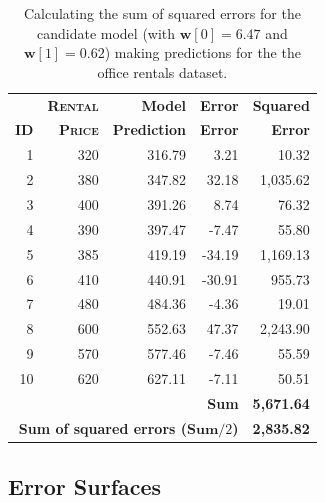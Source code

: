 \documentclass[xcolor={table}]{beamer}
\newcommand{\featN}[1]{\textsc{#1}}
\begin{document}
 \begin{frame} 
\begin{table}
	\caption{Calculating the sum of squared errors for the candidate model (with $\mathbf{w}[0] = 6.47$ and $\mathbf{w}[1] = 0.62$) making predictions for the the office rentals dataset.}
	\centering
			\begin{footnotesize}
	\begin{tabular}{r r r r r }
		\hline
				\textbf{} & \textbf{\featN{Rental}} & \textbf{Model} & \textbf{Error} & \textbf{Squared} \\
		\textbf{ID} & \textbf{\featN{Price}} & \textbf{Prediction} & \textbf{Error} & \textbf{Error} \\
		\hline
		1 & 320	&	316.79	&	3.21	&	10.32	\\
		2 & 380	&	347.82	&	32.18	&	1,035.62	\\
		3 & 400	&	391.26	&	8.74	&	76.32	\\
		4 & 390	&	397.47	&	-7.47	&	55.80	\\
		5 & 385	&	419.19	&	-34.19	&	1,169.13	\\
		6 & 410	&	440.91	&	-30.91	&	955.73	\\
		7 & 480	&	484.36	&	-4.36	&	19.01	\\
		8 & 600	&	552.63	&	47.37	&	2,243.90	\\
		9 & 570	&	577.46	&	-7.46	&	55.59	\\
		10 &	620	&	627.11	&	-7.11	&	50.51	\\
		\hline
		 \multicolumn{4}{r}{\textbf{Sum}} &	\textbf{5,671.64}	\\
		 \multicolumn{4}{r}{\textbf{Sum of squared errors ($\mathbf{Sum}/2$)}} &	\textbf{2,835.82}	\\
		\hline
	\end{tabular}
			\end{footnotesize}
\label{tab:officeSizesAndPricesSumOfSquaredErrorsExample}
\end{table}
\end{frame} 


\subsection{Error Surfaces}
\end{document}
